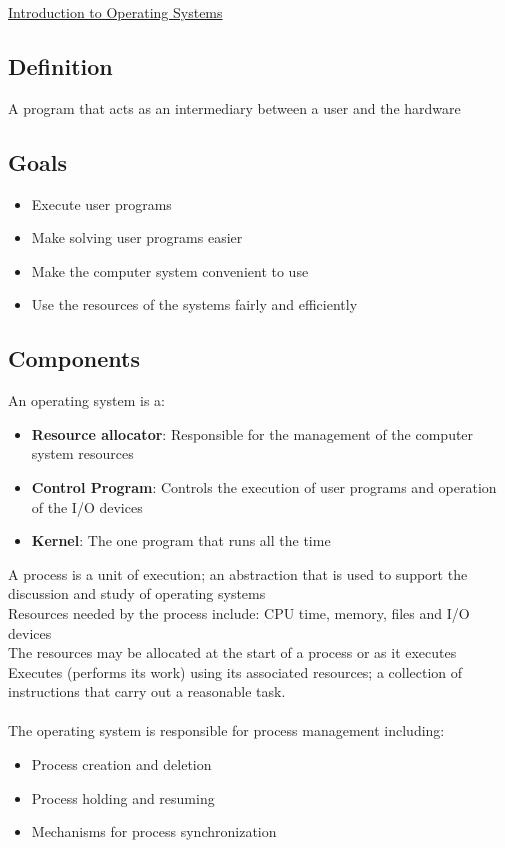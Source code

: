 \documentclass{article}[18pt]
\begin{document}
\begin{center}
\underline{\huge Introduction to Operating Systems}
\end{center}
\subsection{Definition}
A program that acts as an intermediary between a user and the hardware
\subsection{Goals}
\begin{itemize}
	\item Execute user programs
	\item Make solving user programs easier
	\item Make the computer system convenient to use
	\item Use the resources of the systems fairly and efficiently
\end{itemize}
\subsection{Components}
An operating system is a:
\begin{itemize}
	\item \textbf{Resource allocator}: Responsible for the management of the computer system resources
	\item \textbf{Control Program}: Controls the execution of user programs and operation of the I/O devices
	\item \textbf{Kernel}: The one program that runs all the time
\end{itemize}
A process is a unit of execution; an abstraction that is used to support the discussion and study of operating systems\\
Resources needed by the process include: CPU time, memory, files and I/O devices\\
The resources may be allocated at the start of a process or as it executes\\
Executes (performs its work) using its associated resources; a collection of instructions that carry out a reasonable task.\\
\\
The operating system is responsible for process management including:
\begin{itemize}
	\item Process creation and deletion
	\item Process holding and resuming
	\item Mechanisms for process synchronization
\end{itemize}
\end{document}
